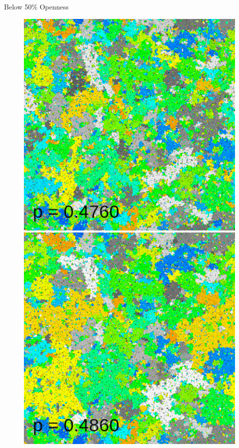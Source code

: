 \documentclass[aspectratio=169, handout]{beamer}
\begin{document}
\begin{frame}{Below 50\% Openness}
\begin{figure}
\includegraphics[scale=0.22]{percolation-gif/percolation-1-40.png}
\includegraphics[scale=0.22]{percolation-gif/percolation-1-50.png}

\end{figure}
\end{frame}
\end{document}
